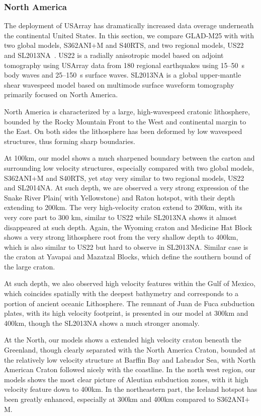 \documentclass[extra,mreferee]{gji}
\begin{document}
\subsubsection{North America}

The deployment of USArray has dramatically increased data overage underneath the
continental United States.
In this section, we compare GLAD-M25 with
with two global models, S362ANI$+$M and S40RTS, and two regional models,
US22~\citep{zhu2017radial} and SL2013NA~\citep{schaeffer2014imaging}.
US22 is a radially anisotropic model based on adjoint tomography using
USArray data from 180 regional earthquakes using 15--50~s
body waves and 25--150~s surface waves.
SL2013NA is a global upper-mantle shear wavespeed model based on multimode
surface waveform tomography primarily focused on North America.

North America is characterized by a large, high-wavespeed cratonic
lithosphere, bounded by the Rocky Mountain Front to the West and continental
margin to the East. On both sides the lithosphere has been deformed by
low wavespeed structures, thus forming sharp boundaries.

At 100km, our model shows a much sharpened boundary between the carton
and surrounding low velocity structures, especially compared with
two global models, S362ANI$+$M and S40RTS, yet stay very similar to
two regional models, US22 and SL2014NA. At such depth,
we are observed a very strong expression of the Snake River Plain(
with Yellowstone) and Raton hotspot, with their depth extending to 200km.
The very high-velocity craton extend to 200km, with its very core part to
300 km, similar to US22 while SL2013NA shows it almost disappeared at such depth.
Again, the Wyoming craton and Medicine Hat Block shows a very strong lithosphere
root from the very shallow depth to 400km, which is also similar to US22 but
hard to observe in SL2013NA. Similar case is the craton at Yavapai and
Mazatzal Blocks, which define the southern bound of the large craton.

At such depth, we also observed high velocity
features within the Gulf of Mexico, which coincides spatially with the deepest
bathymetry and corresponds to a portion of ancient oceanic
Lithosphere\citep{muller2008}. The remnant of Juan de Fuca subduction
plates, with its high velocity footprint, is presented in our model at
300km and 400km, though the SL2013NA shows a much stronger anomaly.

At the North, our models shows a extended high velocity craton beneath the 
Greenland, though clearly separated with the North America Craton,
bounded at the relatively low velocity structure at Barffin Bay and Labrador
Sea, with North American Craton followed nicely with the coastline. In the
north west region, our models shows the most clear picture of
Aleutian subduction zones, with it high velocity feature down to 400km.
In the northeastern part, the Iceland hotspot has been greatly enhanced,
especially at 300km and 400km compared to S362ANI$+$M.
\end{document}
